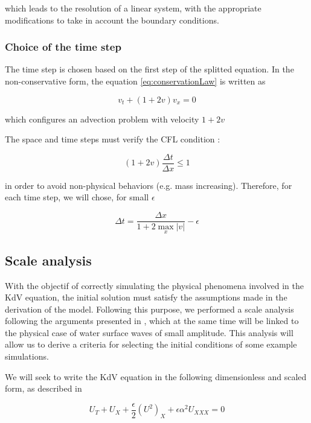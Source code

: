 \noindent which leads to the resolution of a linear system, with the appropriate modifications to take in account the boundary conditions.

\subsubsection{Choice of the time step}

\indent The time step is chosen based on the first step of the splitted equation. In the non-conservative form, the equation \eqref{eq:conservationLaw} is written as

\begin{equation}
v_t +  (1+2v)v_x = 0
\end{equation}

\noindent which configures an advection problem with velocity $1+2v$

\indent The space and time steps must verify the CFL condition : 

\begin{equation}
(1+2v)\frac{\Delta t}{\Delta x} \leq 1
\end{equation}

\noindent in order to avoid non-physical behaviors (e.g. mass increasing). Therefore, for each time step, we will chose, for small $\epsilon$

\begin{equation}
\Delta t = \frac{\Delta x}{1+2\max\limits_{x}|v|} - \epsilon
\end{equation}

\subsection{Scale analysis}

\indent With the objectif of correctly simulating the physical phenomena involved in the KdV equation, the initial solution must satisfy the assumptions made in the derivation of the model. Following this purpose, we performed a scale analysis following the arguments presented in \cite{BBM1971}, which at the same time will be linked to the physical case of water surface waves of small amplitude. This analysis will allow us to derive a criteria for selecting the initial conditions of some example simulations. 

\indent We will seek to write the KdV equation in the following dimensionless and scaled form, as described in \cite{BBM1971}

$$U_T + U_X + \frac{\epsilon}{2} (U^2)_X + \epsilon\alpha^2U_{XXX} = 0$$

